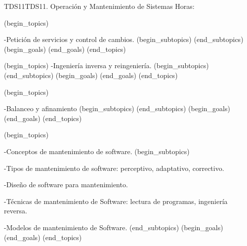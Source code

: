 \begin{BKL2}{TDS11}{TDS11. Operación y Mantenimiento de Sistemas}
Horas:
 
(begin_topics)

-Petición de servicios y control de cambios.
(begin_subtopics)
(end_subtopics)
(begin_goals)
(end_goals)
(end_topics)

 

(begin_topics)
-Ingeniería inversa y reingeniería.
(begin_subtopics)
(end_subtopics)
(begin_goals)
(end_goals)
(end_topics)

 

(begin_topics)

-Balanceo y afinamiento
(begin_subtopics)
(end_subtopics)
(begin_goals)
(end_goals)
(end_topics)

 

(begin_topics)

-Conceptos de mantenimiento de software.
(begin_subtopics)

-Tipos de mantenimiento de software: perceptivo, adaptativo, correctivo.

-Diseño de software para mantenimiento.

-Técnicas de mantenimiento de Software: lectura de programas, ingeniería reversa.

-Modelos de mantenimiento de Software.
(end_subtopics)
(begin_goals)
(end_goals)
(end_topics)

\end{BKL2}



